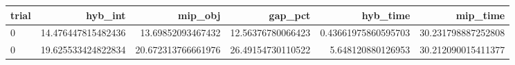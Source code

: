 \begin{tabular}{lrrrrr}
\hline
trial & hyb_int & mip_obj & gap_pct & hyb_time & mip_time \\ \hline
0 & 14.476447815482436 & 13.69852093467432 & 12.56376780066423 & 0.43661975860595703 & 30.231798887252808 \\
0 & 19.625533424822834 & 20.672313766661976 & 26.49154730110522 & 5.648120880126953 & 30.212090015411377 \\
\hline
\end{tabular}
